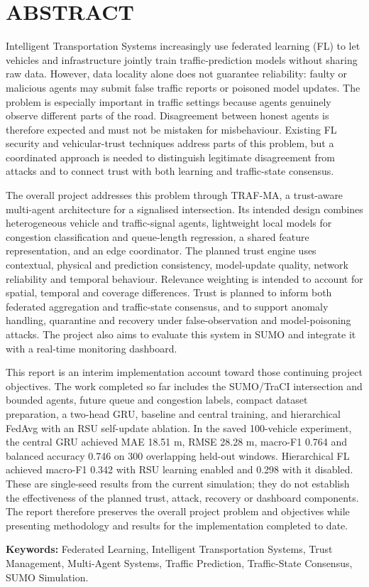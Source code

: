 \chapter*{ABSTRACT}
\justifying
Intelligent Transportation Systems increasingly use federated learning (FL) to let vehicles and infrastructure jointly train traffic-prediction models without sharing raw data. However, data locality alone does not guarantee reliability: faulty or malicious agents may submit false traffic reports or poisoned model updates. The problem is especially important in traffic settings because agents genuinely observe different parts of the road. Disagreement between honest agents is therefore expected and must not be mistaken for misbehaviour. Existing FL security and vehicular-trust techniques address parts of this problem, but a coordinated approach is needed to distinguish legitimate disagreement from attacks and to connect trust with both learning and traffic-state consensus.

The overall project addresses this problem through TRAF-MA, a trust-aware multi-agent architecture for a signalised intersection. Its intended design combines heterogeneous vehicle and traffic-signal agents, lightweight local models for congestion classification and queue-length regression, a shared feature representation, and an edge coordinator. The planned trust engine uses contextual, physical and prediction consistency, model-update quality, network reliability and temporal behaviour. Relevance weighting is intended to account for spatial, temporal and coverage differences. Trust is planned to inform both federated aggregation and traffic-state consensus, and to support anomaly handling, quarantine and recovery under false-observation and model-poisoning attacks. The project also aims to evaluate this system in SUMO and integrate it with a real-time monitoring dashboard.

This report is an interim implementation account toward those continuing project objectives. The work completed so far includes the SUMO/TraCI intersection and bounded agents, future queue and congestion labels, compact dataset preparation, a two-head GRU, baseline and central training, and hierarchical FedAvg with an RSU self-update ablation. In the saved 100-vehicle experiment, the central GRU achieved MAE 18.51 m, RMSE 28.28 m, macro-F1 0.764 and balanced accuracy 0.746 on 300 overlapping held-out windows. Hierarchical FL achieved macro-F1 0.342 with RSU learning enabled and 0.298 with it disabled. These are single-seed results from the current simulation; they do not establish the effectiveness of the planned trust, attack, recovery or dashboard components. The report therefore preserves the overall project problem and objectives while presenting methodology and results for the implementation completed to date.

\textbf{Keywords:} Federated Learning, Intelligent Transportation Systems, Trust Management, Multi-Agent Systems, Traffic Prediction, Traffic-State Consensus, SUMO Simulation.
